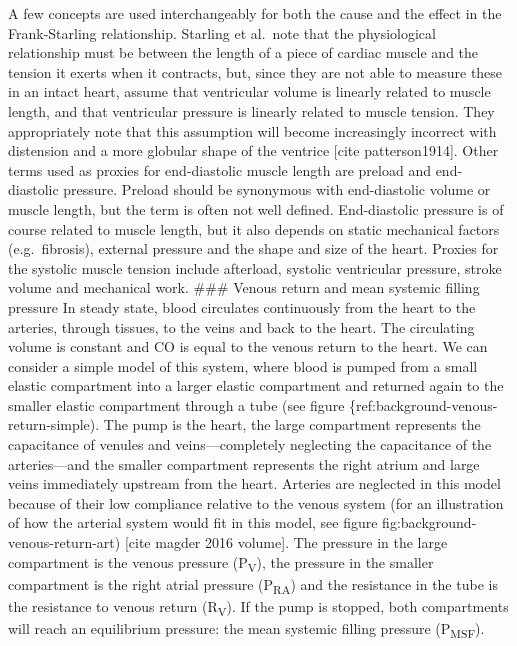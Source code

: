 \documentclass[a4paper, nobind]{templates/ociamthesis}
\begin{document}
A few concepts are used interchangeably for both the cause and the effect in the Frank-Starling relationship. Starling et al.~note that the physiological relationship must be between the length of a piece of cardiac muscle and the tension it exerts when it contracts, but, since they are not able to measure these in an intact heart, assume that ventricular volume is linearly related to muscle length, and that ventricular pressure is linearly related to muscle tension. They appropriately note that this assumption will become increasingly incorrect with distension and a more globular shape of the ventrice {[}cite patterson1914{]}. Other terms used as proxies for end-diastolic muscle length are preload and end-diastolic pressure. Preload should be synonymous with end-diastolic volume or muscle length, but the term is often not well defined. End-diastolic pressure is of course related to muscle length, but it also depends on static mechanical factors (e.g.~fibrosis), external pressure and the shape and size of the heart. Proxies for the systolic muscle tension include afterload, systolic ventricular pressure, stroke volume and mechanical work.
\#\#\# Venous return and mean systemic filling pressure
In steady state, blood circulates continuously from the heart to the arteries, through tissues, to the veins and back to the heart. The circulating volume is constant and CO is equal to the venous return to the heart. We can consider a simple model of this system, where blood is pumped from a small elastic compartment into a larger elastic compartment and returned again to the smaller elastic compartment through a tube (see figure \{ref:background-venous-return-simple). The pump is the heart, the large compartment represents the capacitance of venules and veins---completely neglecting the capacitance of the arteries---and the smaller compartment represents the right atrium and large veins immediately upstream from the heart. Arteries are neglected in this model because of their low compliance relative to the venous system (for an illustration of how the arterial system would fit in this model, see figure fig:background-venous-return-art) {[}cite magder 2016 volume{]}. The pressure in the large compartment is the venous pressure (P\textsubscript{V}), the pressure in the smaller compartment is the right atrial pressure (P\textsubscript{RA}) and the resistance in the tube is the resistance to venous return (R\textsubscript{V}). If the pump is stopped, both compartments will reach an equilibrium pressure: the mean systemic filling pressure (P\textsubscript{MSF}).
\end{document}
